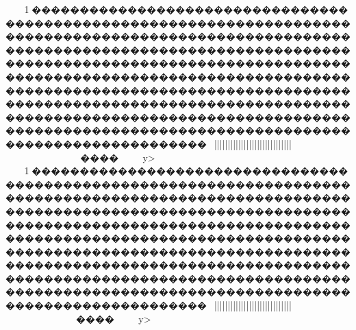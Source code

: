 {{{{{{{{{{{{{{{{{{{{{{{{{{{{{{{{{{{{{{{{{{{{{{{{{{{{{{{{{{{{{{{{{{{{{{{{{{{{{{{{{{{{{{{{{{{{{{{{{{{{{{{{{{{{{{{{{{{{{{{{{{{{{{{{{{{{{{{{{{{{{{{{{{{{{{{{{{{{{{{{{{{{{{{{{{{{{{{{{{{{{{{{{{{{{{{{{{{{{{{{{{{{{{{{{{{{{{{{{{{{{{{{{{{{{{{{{{{{{{{{{{{{{{{{{{{{{{{{{{{{{{{{{{{{{{{{{{{{{{{{{{{{{{{{{{{{{{{{{{{{{{{{{{{{{{{{{{{{{{{{{{{{{{{{{{{{{{{{{{{{{{{{{{{{{{{{{{{{{{{{{{{{{{{{{{{{{{{{{{{{{{{{{{{{{{{{{{{{{{{{{{{{{{{{{{{{{{{{{{{{{{{{{{{{{{{{{{{{{{{{{{{{{{{{{{{{{{{{{{{{{{{{{{{{{{{{{{{{{{{{{{{{{{{{{{{{{{{{{{{{{{{{{{{{{{{{{{{{{{{{{{{{{{{{{{{{{{{{{{{{{{{{{{{{{{{{{{{{{{{{{{{{{{{{{{{{{{{{{{{{{{{{{{{{{{{{{{{{{{{{{{{{{{{{{{{{{{{{{{{{{{{{{{{{{{{{{{{{{{{{{{{{{{{{{{{{{{{{{{{{{{{{{{{{{{{{{{{{{{{{{{{{{{{{{{{{{{{{{{{{{{{{{{{{{{{{{{{{{{{{{{{{{{{{{{{{{{{{{{{{{{{{{{{{{{{{{{{{{{{{{{{{{{{{{{{{{{{{{{{{{{{{{{{{{{{{{{{{{{{{{{{{{{{{{{{{{{{{{{{{{{{{{{{{{{{{{{{{{{{{{{{{{{{{{{{{{{{{{{{{{{{{{{{{{{{{{{{{{{{{{{{{{{{{{{{{{{{{{{{{{{{{{{{{{{{{{{{{{{{{{{{{{{{{{{{{{{{{{{{{{{{{{{{{{{{{{{{{{{{{{{{{{{{{{{{{{{{{{{{{{{{{{{{{{{{{{{{{{{{1\ky������������������������������������������������������������������������������������������������������������������������������������������������������������������������������������������������������������������������������������������������������������������������������������������������������������������������������������������������������������������������������������������~}}||}}}}}|||||||||||||||{{{{{{{{{||||||||||||}}}}~~~~~~~~~~����y>
1\ky������������������������������������������������������������������������������������������������������������������������������������������������������������������������������������������������������������������������������������������������������������������������������������������������������������������������������������������������������������������������������������������~}}||}}}}}|||||||||||||||{{{{{{{{{||||||||||||}}}}~~~~~~~~����y>
}}}}}}}}}}}}}}}}}}}}}}}}}}}}}}}}}}}}}}}}}}}}}}}}}}}}}}}}}}}}}}}}}}}}}}}}}}}}}}}}}}}}}}}}}}}}}}}}}}}}}}}}}}}}}}}}}}}}}}}}}}}}}}}}}}}}}}}}}}}}}}}}}}}}}}}}}}}}}}}}}}}}}}}}}}}}}}}}}}}}}}}}}}}}}}}}}}}}}}}}}}}}}}}}}}}}}}}}}}}}}}}}}}}}}}}}}}}}}}}}}}}}}}}}}}}}}}}}}}}}}}}}}}}}}}}}}}}}}}}}}}}}}}}}}}}}}}}}}}}}}}}}}}}}}}}}}}}}}}}}}}}}}}}}}}}}}}}}}}}}}}}}}}}}}}}}}}}}}}}}}}}}}}}}}}}}}}}}}}}}}}}}}}}}}}}}}}}}}}}}}}}}}}}}}}}}}}}}}}}}}}}}}}}}}}}}}}}}}}}}}}}}}}}}}}}}}}}}}}}}}}}}}}}}}}}}}}}}}}}}}}}}}}}}}}}}}}}}}}}}}}}}}}}}}}}}}}}}}}}}}}}}}}}}}}}}}}}}}}}}}}}}}}}}}}}}}}}}}}}}}}}}}}}}}}}}}}}}}}}}}}}}}}}}}}}}}}}}}}}}}}}}}}}}}}}}}}}}}}}}}}}}}}}}}}}}}}}}}}}}}}}}}}}}}}}}}}}}}}}}}}}}}}}}}}}}}}}}}}}}}}}}}}}}}}}}}}}}}}}}}}}}}}}}}}}}}}}}}}}}}}}}}}}}}}}}}}}}}}}}}}}}}}}}}}}}}}}}}}}}}}}}}}}}}}}}}}}}}}}}}}}}}}}}}}}}}}}}}}}}}}}}}}}}}}}}}}}}}}}}}}}}}}}}}}}}}}}}}}}}}}}}}}}}}}}}}}}}}}}}}}}}}}}}}}}}}}}}}}}}}}}}}}}}}}}}}}}}}}}}}}}}}}}}}}}}}}}}}}}}}}}}}}}}}}}}}}}}}}}}}}}}}}}}}}}}}}}}}}}}}}}}}}}}}}}}}}}}}}}}}}}}}}}}}}}}}}}
